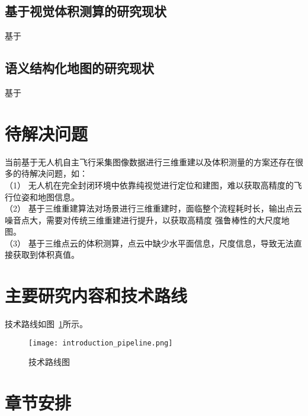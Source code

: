 \subsection{基于视觉体积测算的研究现状}
\label{sec:1.2.3}
基于
\subsection{语义结构化地图的研究现状}
\label{sec:1.2.4}
基于
\section{待解决问题}
\label{sec:1.3}
当前基于无人机自主飞行采集图像数据进行三维重建以及体积测量的方案还存在很多的待解决问题，如：\\
（1）	无人机在完全封闭环境中依靠纯视觉进行定位和建图，难以获取高精度的飞行位姿和地图信息。\\
（2）	基于三维重建算法对场景进行三维重建时，面临整个流程耗时长，输出点云噪音点大，需要对传统三维重建进行提升，以获取高精度
强鲁棒性的大尺度地图。\\
（3）	基于三维点云的体积测算，点云中缺少水平面信息，尺度信息，导致无法直接获取到体积真值。\\
\section{主要研究内容和技术路线}
\label{sec:1.4}
技术路线如图~\ref{fig:introduction_pipeline}所示。
\begin{figure}[H] %
  \centering
  \texttt{[image: introduction\_pipeline.png]}
  \caption{技术路线图}
  \label{fig:introduction_pipeline}
\end{figure}
\section{章节安排}
\label{sec:1.4}

